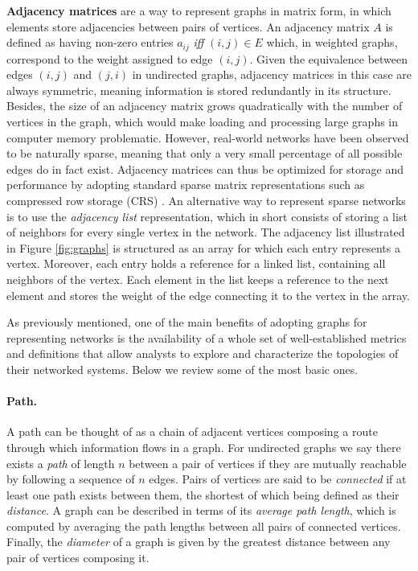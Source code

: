 \textbf{Adjacency matrices} are a way to represent graphs in matrix form, in which elements store adjacencies between pairs of vertices.
An adjacency matrix $A$ is defined as having non-zero entries $a_{i j}$\textit{ iff } $(i,j)\in E$ which, in weighted graphs, correspond to the weight assigned to edge $(i,j)$.
Given the equivalence between edges $(i,j)$ and $(j,i)$ in undirected graphs, adjacency matrices in this case are always symmetric, meaning information is stored redundantly in its structure.
%
Besides, the size of an adjacency matrix grows quadratically with the number of vertices in the graph, which would make loading and processing large graphs in computer memory problematic.
However, real-world networks have been observed to be naturally sparse, meaning that only a very small percentage of all possible edges do in fact exist.
Adjacency matrices can thus be optimized for storage and performance by adopting standard sparse matrix representations such as compressed row storage (CRS) \cite{Saad2003}.
An alternative way to represent sparse networks is to use the \textit{adjacency list} representation, which in short consists of storing a list of neighbors for every single vertex in the network. 
The adjacency list illustrated in Figure \ref{fig:graphs} is structured as an array for which each entry represents a vertex.
Moreover, each entry holds a reference for a linked list, containing all neighbors of the vertex. Each element in the list keeps a reference to the next element and stores the weight of the edge connecting it to the vertex in the array.

As previously mentioned, one of the main benefits of adopting graphs for representing networks is the availability of a whole set of well-established metrics and definitions that allow analysts to explore and characterize the topologies of their networked systems.
Below we review some of the most basic ones.

\paragraph*{Path.}
A path can be thought of as a chain of adjacent vertices composing a route through which information flows in a graph.
For undirected graphs we say there exists a \textit{path} of length $n$ between a pair of vertices if they are mutually reachable by following a sequence of $n$ edges.
Pairs of vertices are said to be \textit{connected} if at least one path exists between them, the shortest of which being defined as their \textit{distance}.
A graph can be described in terms of its \textit{average path length}, which is computed by averaging the path lengths between all pairs of connected vertices.
Finally, the \textit{diameter} of a graph is given by the greatest distance between any pair of vertices composing it.

